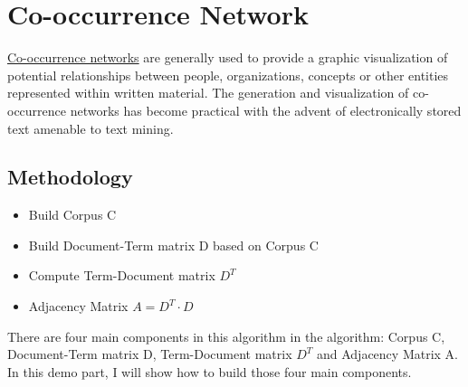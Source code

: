 \documentclass[letterpaper,11pt,english]{sphinxmanual}
\begin{document}
\section{Co-occurrence Network}
\label{socialnetwork:co-occurrence-network}
\href{https://en.wikipedia.org/wiki/Co-occurrence\_networks}{Co-occurrence networks} are generally used to provide a graphic visualization of potential relationships between people, organizations, concepts or other entities represented within written material. The generation and visualization of co-occurrence networks has become practical with the advent of electronically stored text amenable to text mining.


\subsection{Methodology}
\label{socialnetwork:methodology}\begin{itemize}
\item {} 
Build Corpus C

\item {} 
Build Document-Term matrix D based on Corpus C

\item {} 
Compute Term-Document matrix \(D^T\)

\item {} 
Adjacency Matrix \(A =D^T\cdot D\)

\end{itemize}

There are four main components in this algorithm in the algorithm: Corpus C, Document-Term
matrix D, Term-Document matrix \(D^T\) and Adjacency Matrix A. In this demo part, I will show how
to build those four main components.
\end{document}
